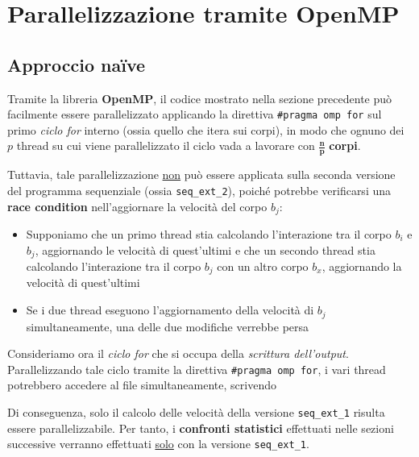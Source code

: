 \documentclass[12pt]{report}
\begin{document}
    \section{Parallelizzazione tramite OpenMP}

    \subsection{Approccio naïve}

    Tramite la libreria \textbf{OpenMP}, il codice mostrato nella sezione precedente può facilmente essere parallelizzato applicando la direttiva \texttt{\#pragma omp for} sul primo \textit{ciclo for} interno (ossia quello che itera sui corpi), in modo che ognuno dei $p$ thread su cui viene parallelizzato il ciclo vada a lavorare con $\mathbf{\frac{n}{p}}$ \textbf{corpi}.

    Tuttavia, tale parallelizzazione \underline{non} può essere applicata sulla seconda versione del programma sequenziale (ossia \texttt{seq\_ext\_2}), poiché potrebbe verificarsi una \textbf{race condition} nell'aggiornare la velocità del corpo $b_j$:
    
    \begin{itemize}
        \item Supponiamo che un primo thread stia calcolando l'interazione tra il corpo $b_i$ e $b_j$, aggiornando le velocità di quest'ultimi e che un secondo thread stia calcolando l'interazione tra il corpo $b_j$ con un altro corpo $b_x$, aggiornando la velocità di quest'ultimi
        \item Se i due thread eseguono l'aggiornamento della velocità di $b_j$ simultaneamente, una delle due modifiche verrebbe persa
    \end{itemize}

    Consideriamo ora il \textit{ciclo for} che si occupa della \textit{scrittura dell'output}. Parallelizzando tale ciclo tramite la direttiva \texttt{\#pragma omp for}, i vari thread potrebbero accedere al file simultaneamente, scrivendo  

    Di conseguenza, solo il calcolo delle velocità della versione \texttt{seq\_ext\_1} risulta essere parallelizzabile. Per tanto, i \textbf{confronti statistici} effettuati nelle sezioni successive verranno effettuati \underline{solo} con la versione \texttt{seq\_ext\_1}.
\end{document}
